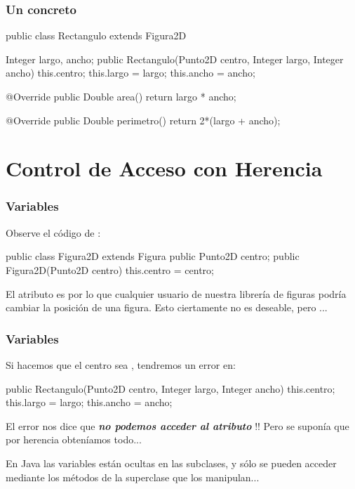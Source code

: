\documentclass{beamer}
\begin{document}
\begin{frame}[fragile]
  \frametitle{Un  concreto}
  \begin{jsmall}
    public class Rectangulo extends Figura2D {
      Integer largo, ancho;
      public Rectangulo(Punto2D centro, Integer largo, Integer ancho) {
        this.centro;
        this.largo = largo;
        this.ancho = ancho;
      }

      @Override
      public Double area() {
        return largo * ancho;
      }

      @Override
      public Double perimetro() {
        return 2*(largo + ancho);
      }        
    }
  \end{jsmall}  
\end{frame}

\section{Control de Acceso con Herencia}

\begin{frame}[fragile]
  \frametitle{Variables }

Observe el código de :

\begin{jsmall}
public class Figura2D extends Figura {
  public Punto2D centro;
  public Figura2D(Punto2D centro) {
    this.centro = centro;
  }
}
\end{jsmall}

El atributo es  por lo que cualquier usuario de nuestra
librería de figuras podría cambiar la posición de una figura. Esto
ciertamente no es deseable, pero ...

\end{frame}

\begin{frame}[fragile]
  \frametitle{Variables }

Si hacemos que el centro sea , tendremos un error en:

\begin{jsmall}
public Rectangulo(Punto2D centro, Integer largo, Integer ancho) {
  this.centro;
  this.largo = largo;
  this.ancho = ancho;
}
\end{jsmall}

El error nos dice que \textbf{\textit{no podemos acceder al atributo
    }}!! Pero se suponía que por herencia obteníamos
todo...

En Java las variables  están ocultas en las subclases,
y sólo se pueden acceder mediante los métodos de la superclase que los
manipulan...

\end{frame}
\end{document}
